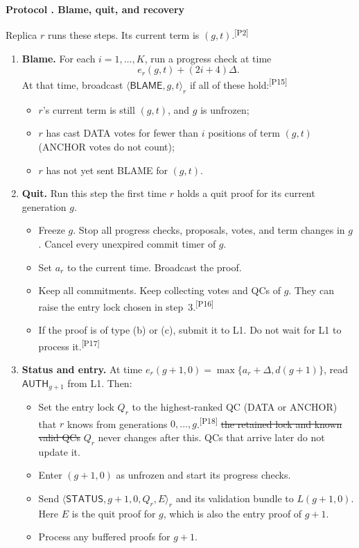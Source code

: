 \documentclass[11pt,a4paper]{article}
\newcommand{\RR}[1]{{\color{rrRed}#1}}
\newcommand{\NEW}[1]{{\color{diffNew}#1}}
\newcommand{\DEL}[1]{{\color{diffDel}\sout{#1}}}
\newcommand{\CH}[1]{\textsuperscript{\color{diffNew}\sffamily\scriptsize[#1]}}
\newcommand{\NEW}[1]{#1}
\newcommand{\DEL}[1]{}
\newcommand{\CH}[1]{}
\newcommand{\tagg}[1]{\ensuremath{\mathsf{#1}}}
\newcounter{protocol}
\newenvironment{protocol}[2]{\refstepcounter{protocol}\label{#1}
\begin{mdframed}[nobreak=true,linewidth=.6pt,skipabove=8pt,skipbelow=8pt,
innertopmargin=7pt,innerbottommargin=7pt]\small
\textbf{Protocol \theprotocol. #2}\par\smallskip}{\end{mdframed}}
\begin{document}
\begin{protocol}{alg:recovery}{Blame, quit, and recovery}
\NEW{Replica $r$ runs these steps. Its current term is $(g,t)$.}\CH{P2}
\begin{enumerate}[label=\textbf{\arabic*)},itemsep=5pt]
\item \textbf{Blame.} For each $i=1,\ldots,K$, run a progress check at
time
\[
 e_r(g,t)+(2i+4)\Delta.
\]
At that time, broadcast $\langle\tagg{BLAME},g,t\rangle_r$ if all of these
hold:\CH{P15}
 \begin{itemize}
 \item \NEW{$r$'s current term is still $(g,t)$, and $g$ is unfrozen;}
 \item \NEW{$r$ has cast DATA votes for fewer than $i$ positions of term
       $(g,t)$} \RR{(ANCHOR votes do not count)};
 \item \NEW{$r$ has not yet sent BLAME for $(g,t)$.}
 \end{itemize}

\item \textbf{Quit.} Run this step the first time $r$ holds a quit proof
for its current generation $g$.
 \begin{itemize}
 \item \RR{Freeze $g$. Stop all progress checks, proposals, votes, and
       term changes in $g$. Cancel every unexpired commit timer of $g$.}
 \item Set $a_r$ to the current time. Broadcast the proof.
 \item Keep all commitments. Keep collecting votes and QCs of $g$\NEW{.
       They can raise the entry lock chosen in step~3.}\CH{P16}
 \item \RR{If the proof is \NEW{of type (b) or (c)}, submit it to L1. Do
       not wait for L1 to process it.}\CH{P17}
 \end{itemize}

\item \textbf{Status and entry.} \RR{At time
$e_r(g+1,0)=\max\{a_r+\Delta,d(g+1)\}$, read $\tagg{AUTH}_{g+1}$ from L1.}
Then:
 \begin{itemize}
 \item Set the entry lock $Q_r$ to the highest-ranked QC
       \NEW{(DATA or ANCHOR)} that $r$ knows from generations
       $0,\ldots,g$.\CH{P18} \DEL{the retained lock and known valid QCs}
       $Q_r$ never changes after this. QCs that arrive later do not update
       it.
 \item Enter $(g+1,0)$ \RR{as unfrozen and start its progress checks}.
 \item Send $\langle\tagg{STATUS},g+1,0,Q_r,E\rangle_r$ and its validation
       bundle to \RR{$L(g+1,0)$}. Here $E$ is the quit proof for $g$\NEW{,
       which is also the entry proof of $g+1$}.
 \item \RR{Process any buffered proofs for $g+1$.}
 \end{itemize}


\end{enumerate}
\end{protocol}
\end{document}
